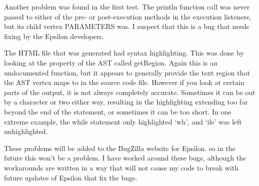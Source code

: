 Another problem was found in the first test. The println function call was never passed to either of the pre- or post-execution methods in the execution listeners, but its child vertex PARAMETERS was. I suspect that this is a bug that needs fixing by the Epsilon developers. 

The HTML file that was generated had syntax highlighting. This was done by looking at the property of the AST called getRegion. Again this is an undocumented function, but it appears to generally provide the text region that the AST vertex maps to in the source code file. However if you look at certain parts of the output, it is not always completely accurate. Sometimes it can be out by a character or two either way, resulting in the highlighting extending too far beyond the end of the statement, or sometimes it can be too short. In one extreme example, the while statement only highlighted `wh', and `ile' was left unhighlighted.

These problems will be added to the BugZilla website for Epsilon, so in the future this won't be a problem. I have worked around these bugs, although the workarounds are written in a way that will not cause my code to break with future updates of Epsilon that fix the bugs. 